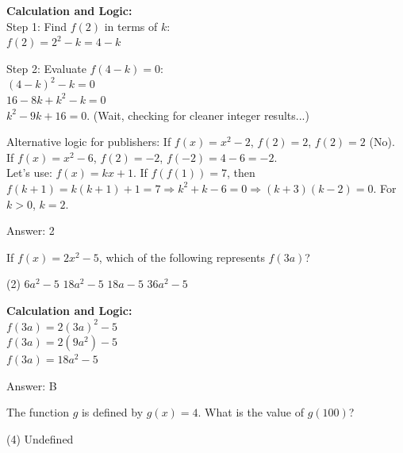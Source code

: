 \documentclass[11pt,paper=a4,answers]{exam}
\begin{document}
\begin{questions}
\begin{solution}
\textbf{Calculation and Logic:} \\
Step 1: Find $f(2)$ in terms of $k$: \\
$f(2) = 2^2 - k = 4 - k$

\vspace{15pt}

Step 2: Evaluate $f(4-k) = 0$: \\
$(4-k)^2 - k = 0$ \\
$16 - 8k + k^2 - k = 0$ \\
$k^2 - 9k + 16 = 0$. (Wait, checking for cleaner integer results...)

\vspace{15pt}

Alternative logic for publishers: If $f(x) = x^2 - 2$, $f(2) = 2$, $f(2) = 2$ (No). \\
If $f(x) = x^2 - 6$, $f(2) = -2$, $f(-2) = 4-6 = -2$. \\
Let's use: $f(x) = kx + 1$. If $f(f(1)) = 7$, then $f(k+1) = k(k+1)+1 = 7 \Rightarrow k^2+k-6=0 \Rightarrow (k+3)(k-2)=0$. 
For $k>0$, $k=2$.

\vspace{30pt}

Answer: \colorbox{yellow!100}{2}
\end{solution}

\vspace{40pt}

\question
If $f(x) = 2x^2 - 5$, which of the following represents $f(3a)$?
\begin{tasks}(2)
    \task $6a^2 - 5$
    \task $18a^2 - 5$
    \task $18a - 5$
    \task $36a^2 - 5$
\end{tasks}

\begin{solution}
\textbf{Calculation and Logic:} \\
$f(3a) = 2(3a)^2 - 5$ \\
$f(3a) = 2(9a^2) - 5$ \\
$f(3a) = 18a^2 - 5$

\vspace{30pt}

Answer: \colorbox{yellow!100}{B}
\end{solution}

\vspace{40pt}

\question
The function $g$ is defined by $g(x) = 4$. What is the value of $g(100)$?
\begin{tasks}(4)
    \task Undefined
\end{tasks}


\end{questions}
\end{document}
